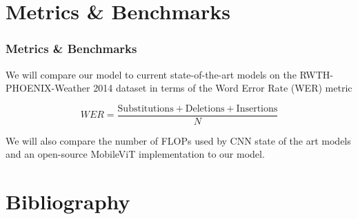 \documentclass[english, xcolor={table}]{beamer}
\begin{document}
\section{Metrics \& Benchmarks}
\begin{frame}
  \frametitle{Metrics \& Benchmarks}

  We will compare our model to current state-of-the-art models on the RWTH-PHOENIX-Weather 2014 dataset in terms of the Word Error Rate (WER) metric 
  
  \[WER = \frac{\text{Substitutions}+\text{Deletions}+\text{Insertions}}{N}\]

  We will also compare the number of FLOPs used by CNN state of the art models\cite{hu_continuous_2023, ahn_slowfast_2023} and an open-source MobileViT implementation to our model.
\end{frame}

\section{Bibliography}



\end{document}
